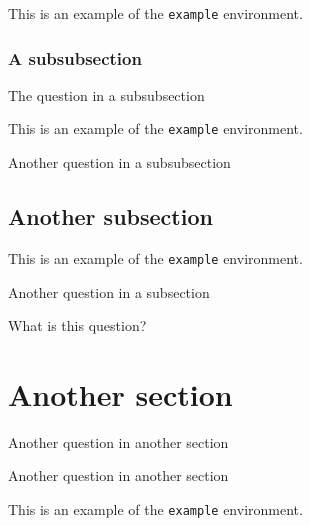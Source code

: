 \documentclass{scrartcl}
\begin{document}
\begin{example}
    This is an example of the \texttt{example} environment.
\end{example}

\subsubsection{A subsubsection}

\begin{question}
The question in a subsubsection
\end{question}

\begin{example}
    This is an example of the \texttt{example} environment.
\end{example}

\begin{question}
Another question in a subsubsection
\end{question}

\subsection{Another subsection}

\begin{example}
    This is an example of the \texttt{example} environment.
\end{example}

\begin{question}
Another question in a subsection
\end{question}

\begin{question}
What is this question?
\end{question}

\section{Another section}

\begin{question}
Another question in another section
\end{question}

\begin{question}
Another question in another section
\end{question}

\begin{example}
    This is an example of the \texttt{example} environment.
\end{example}
\end{document}
